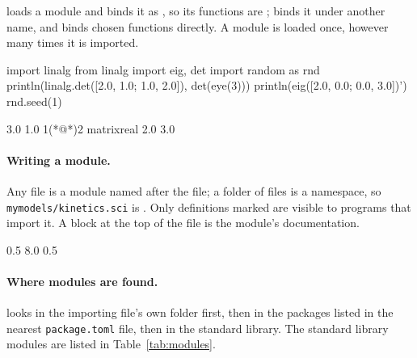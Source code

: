 \documentclass[11pt,a4paper,openany]{report}
\begin{document}
{{ loads a module and binds it as , so its functions are
;  binds it under another name, and
 binds chosen functions directly. A module is loaded
once, however many times it is imported.

\begin{axon}
import linalg
from linalg import eig, det
import random as rnd
println(linalg.det([2.0, 1.0; 1.0, 2.0]), det(eye(3)))
println(eig([2.0, 0.0; 0.0, 3.0])')
rnd.seed(1)
\end{axon}
\begin{axonout}
3.0 1.0
1(*@\texttimes@*)2 matrix{real}
  2.0  3.0
\end{axonout}

\paragraph{Writing a module.} Any  file is a module named after the
file; a folder of files is a namespace, so \texttt{mymodels/kinetics.sci} is
. Only definitions marked  are visible to
programs that import it. A \code{##} block at the top of the file is the
module's documentation.

\begin{axonout}
0.5 8.0
0.5
\end{axonout}

\paragraph{Where modules are found.}  looks in the importing
file's own folder first, then in the packages listed in the nearest
\texttt{package.toml} file, then in the standard library. The standard library
modules are listed in Table~\ref{tab:modules}.

}}
\end{document}
